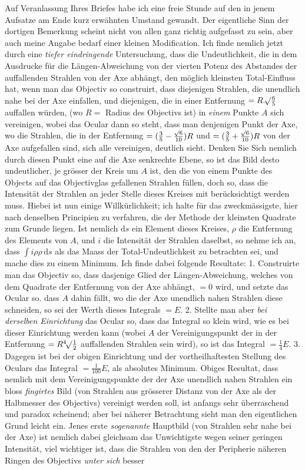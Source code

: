 Auf Veranlassung Ihres Briefes habe ich eine freie Stunde auf den in jenem Aufsatze am Ende kurz erwähnten Umstand gewandt. Der eigentliche Sinn der dortigen Bemerkung scheint nicht von allen ganz richtig aufgefasst zu sein, aber auch meine Angabe bedarf einer kleinen Modification. Ich finde nemlich jetzt durch eine \textit{tiefer eindringende} Untersuchung, dass die Undeutlichkeit, die in dem Ausdrucke für die Längen-Abweichung von der vierten Potenz des Abstandes der auffallenden Strahlen von der Axe abhängt, den möglich kleinsten Total-Einfluss hat, wenn man das Objectiv so construirt, dass diejenigen Strahlen, die unendlich nahe bei der Axe einfallen, und diejenigen, die in einer Entfernung $=R.\BareRoot{\tfrac65}$ auffallen würden, (wo $R=$ Radius des Objectivs ist) in \textit{einem} Punkte $A$ sich vereinigen, wobei das Ocular dann so steht, dass man denjenigen Punkt der Axe, wo die Strahlen, die in der Entfernung $=(\tfrac35-\tfrac{\BareRoot{6}}{10})R$ und $=(\tfrac35+\tfrac{\BareRoot{6}}{10})R$ von der Axe aufgefallen sind, sich alle vereinigen, deutlich sieht. Denken Sie Sich nemlich durch diesen Punkt eine auf die Axe senkrechte Ebene, so ist das Bild desto undeutlicher, je grösser der Kreis um $A$ ist, den die von einem Punkte des Objects auf das Objectivglas gefallenen Strahlen füllen, doch so, dass die Intensität der Strahlen an jeder Stelle dieses Kreises mit berücksichtigt werden muss. Hiebei ist nun einige Willkürlichkeit; ich halte für das zweckmässigste, hier nach denselben Principien zu verfahren, die der Methode der kleinsten Quadrate zum Grunde liegen. Ist nemlich $\mathrm{d}s$ ein Element dieses Kreises, $\rho$ die Entfernung des Elements von $A$, und $i$ die Intensität der Strahlen daselbst, so nehme ich an, dass $\int i\rho\rho\,\mathrm{d}s$ als das Maass der Total-Undeutlichkeit zu betrachten sei, und mache dies zu einem Minimum. Ich finde dabei folgende Resultate: 1. Construirte man das Objectiv so, dass dasjenige Glied der Längen-Abweichung, welches von dem Quadrate der Entfernung von der Axe abhängt, $=0$ wird, und setzte das Ocular so. dass $A$ dahin fällt, wo die der Axe unendlich nahen Strahlen diese schneiden, so sei der Werth dieses Integrals $=E$. 2. Stellte man aber \textit{bei derselben Einrichtung} das Ocular so, dass das Integral so klein wird, wie es bei dieser Einrichtung werden kann (wobei $A$ der Vereinigungspunkt der in der Entfernung $=R\BareRoot[4]{\tfrac12}$ auffallenden Strahlen sein wird), so ist das Integral $=\tfrac14E$. 3. Dagegen ist bei der obigen Einrichtung und der vortheilhaftesten Stellung des Oculars das Integral $=\tfrac{1}{100}E$, als absolutes Minimum. Obiges Resultat, dass nemlich mit dem Vereinigungspunkte der der Axe unendlich nahen Strahlen ein bloss \textit{fingirtes} Bild (von Strahlen aus grösserer Distanz von der Axe als der Halbmesser des Objectivs) vereinigt werden soll, ist anfangs sehr überraschend und paradox scheinend; aber bei näherer Betrachtung sieht man den eigentlichen Grund leicht ein. Jenes erste \textit{sogenannte} Hauptbild (von Strahlen sehr nahe bei der Axe) ist nemlich dabei gleichsam das Unwichtigste wegen seiner geringen Intensität, viel wichtiger ist, dass die Strahlen von den der Peripherie näheren Ringen des Objectivs \textit{unter sich} besser 
